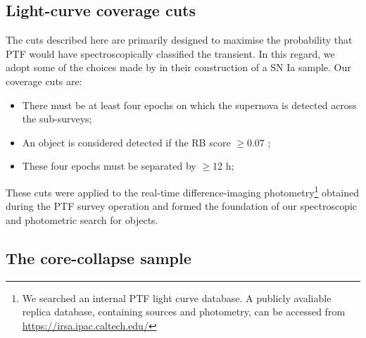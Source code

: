 \documentclass[a4paper,fleqn,usenatbib]{mnras}
\begin{document}
\subsection{Light-curve coverage cuts}
\label{sec:coverage_cuts}

The cuts described here are primarily designed to maximise the probability that PTF would have spectroscopically classified the transient. In this regard, we adopt some of the choices made by \citet{Frohmaier19} in their construction of a SN Ia sample. Our coverage cuts are:

\begin{itemize}
    \item There must be at least four epochs on which the supernova is detected across the sub-surveys;
    \item An object is considered detected if the RB score $\ge$0.07 \citep{Bloom};
    \item These four epochs must be separated by $\ge$12 h;
\end{itemize}

These cuts were applied to  the real-time difference-imaging photometry\footnote{We searched an internal PTF light curve database. A publicly avaliable replica database, containing sources and photometry, can be accessed from \url{https://irsa.ipac.caltech.edu/} } obtained during the PTF survey operation and formed the foundation of our spectroscopic and photometric search for objects.

\subsection{The core-collapse sample}
\label{sec:CCSample}
\end{document}
